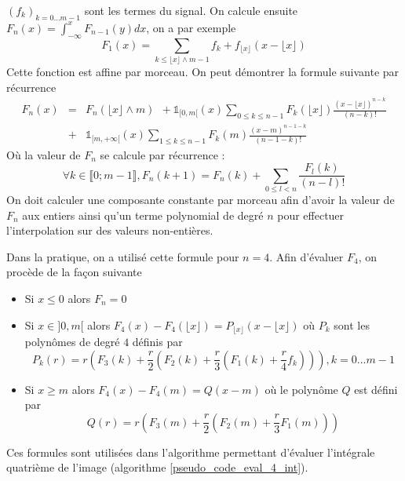 $(f_k)_{k=0...m-1}$ sont les termes du signal. On calcule ensuite $F_{n}(x)=\int_{-\infty}^{x}F_{n-1}(y)dx$, on a par exemple
\begin{equation*}
F_{1}(x)=\underset{k\le \lfloor x\rfloor \wedge m-1}{\sum}f_{k}+ f_{\lfloor x\rfloor}
(x-\lfloor x\rfloor)
\end{equation*}
Cette fonction est affine par morceau. On peut démontrer la formule suivante par récurrence
\begin{eqnarray*}
F_{n}(x) &=& F_{n}(\lfloor x\rfloor \wedge m)~~+\mathds{1}_{[0,m[}(x) \underset{0\le k \le n-1}{\sum}F_{k}(\lfloor x \rfloor) \frac{(x-\lfloor x \rfloor)^{n-k}}{(n-k)!}\\
          &+&\mathds{1}_{[m,+\infty[}(x)\underset{1\le k \le n-1}{\sum}F_{k}(m) \frac{(x-m)^{n-1-k}}{(n-1-k)!}
\end{eqnarray*}
Où la valeur de $F_{n}$ se calcule par récurrence :
\begin{equation*}
\forall k \in \llbracket 0 ;m-1 \rrbracket, F_{n}(k+1)=F_{n}(k)+\underset{0\le l < n}{\sum} \frac{F_{l}(k)}{(n-l)!}
\end{equation*}
On doit calculer une composante constante par morceau afin d'avoir la valeur de $F_{n}$ aux entiers ainsi qu'un terme polynomial de degré $n$ pour effectuer l'interpolation sur des valeurs non-entières.

Dans la pratique, on a utilisé cette formule pour $n=4$. Afin d'évaluer $F_4$, on procède de la façon suivante 
\begin{itemize}
\item Si $x\le 0$ alors $F_{n}=0$
\item Si $x\in ]0 , m[$ alors $F_{4}(x)-F_{4}(\lfloor x \rfloor)=P_{\lfloor x \rfloor}(x-\lfloor x \rfloor)$ où $P_k$ sont les polynômes de degré $4$ définis par
\begin{equation*}
P_k (r) =r \left( F_{3}(k) +\frac{r}{2} \left(F_{2}(k)+ \frac{r}{3}\left(F_{1}(k)+\frac{r}{4} f_{k}\right)\right)\right), k=0...m-1
\end{equation*}
\item Si $x\ge m$ alors $F_{4}(x)-F_{4}(m)=Q(x-m)$ où le polynôme $Q$ est défini par
\begin{equation*}
Q(r)=r \left(F_{3}(m)+\frac{r}{2} \left( F_{2}(m) + \frac{r}{3} F_1 (m)\right)\right)
\end{equation*}

\end{itemize}
Ces formules sont utilisées dans l'algorithme permettant d'évaluer l'intégrale quatrième de l'image (algorithme \ref{pseudo_code_eval_4_int}).

